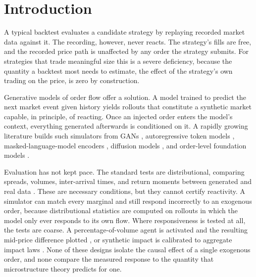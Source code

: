 \documentclass[sigconf,anonymous]{acmart}
\begin{document}

\maketitle

\section{Introduction}

A typical backtest evaluates a candidate strategy by replaying recorded market data against it. The recording, however, never reacts. The strategy's fills are free, and the recorded price path is unaffected by any order the strategy submits. For strategies that trade meaningful size this is a severe deficiency, because the quantity a backtest most needs to estimate, the effect of the strategy's own trading on the price, is zero by construction.

Generative models of order flow offer a solution. A model trained to predict the next market event given history yields rollouts that constitute a synthetic market capable, in principle, of reacting. Once an injected order enters the model's context, everything generated afterwards is conditioned on it. A rapidly growing literature builds such simulators from GANs \citep{coletta2021,coletta2022}, autoregressive token models \citep{nagy2023}, masked-language-model encoders \citep{lobert2025}, diffusion models \citep{trades2025,difflob2026}, and order-level foundation models \citep{mars2025}.

Evaluation has not kept pace. The standard tests are distributional, comparing spreads, volumes, inter-arrival times, and return moments between generated and real data \citep{cont2001,lobbench2025}. These are necessary conditions, but they cannot certify reactivity. A simulator can match every marginal and still respond incorrectly to an exogenous order, because distributional statistics are computed on rollouts in which the model only ever responds to its own flow. Where responsiveness is tested at all, the tests are coarse. A percentage-of-volume agent is activated and the resulting mid-price difference plotted \citep{coletta2022,trades2025}, or synthetic impact is calibrated to aggregate impact laws \citep{mars2025,noble2026}. None of these designs isolate the causal effect of a single exogenous order, and none compare the measured response to the quantity that microstructure theory predicts for one.
\end{document}
